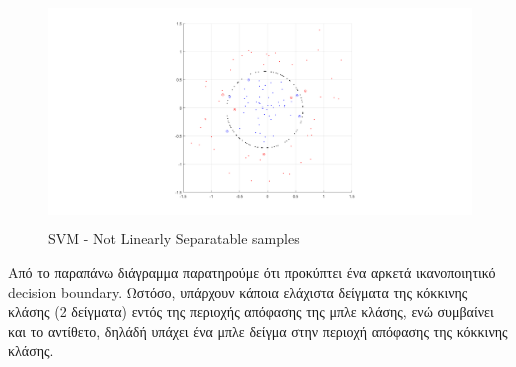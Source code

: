 \documentclass{article}
\begin{document}
 	\begin{figure}[h!]
 		\centering
 		\includegraphics[height=6cm,width=\linewidth]{../exercise2_6/images/ex6_ex3_C_100.png}
 		\caption{SVM - Νot Linearly Separatable samples }
 	\end{figure}
 	\noindent
 	Από το παραπάνω διάγραμμα παρατηρούμε ότι προκύπτει ένα αρκετά ικανοποιητικό decision boundary. Ωστόσο, υπάρχουν κάποια ελάχιστα δείγματα της κόκκινης κλάσης (2 δείγματα) εντός της περιοχής απόφασης της μπλε κλάσης, ενώ συμβαίνει και το αντίθετο, δηλάδή υπάχει ένα μπλε δείγμα στην περιοχή απόφασης της κόκκινης κλάσης. 
\end{document}
